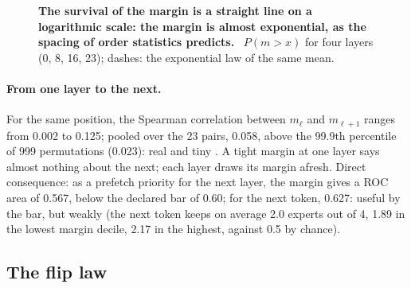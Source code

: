 \begin{figure}[tbp]
\centering
\GrapheTropicaleSurvie
\caption[The law of the margin]{\textbf{The survival of the margin is a straight line on a logarithmic scale: the margin is almost exponential, as the spacing of order statistics predicts.} \mes~$P(m > x)$ for four layers (0, 8, 16, 23); dashes: the exponential law of the same mean. }
\label{fig:t3-trop-survie}
\end{figure}

\paragraph{From one layer to the next.} For the same position, the Spearman correlation between $m_\ell$ and $m_{\ell+1}$ ranges from 0.002 to 0.125; pooled over the 23 pairs, 0.058, above the 99.9th percentile of 999 permutations (0.023): real and tiny \mes. A tight margin at one layer says almost nothing about the next; each layer draws its margin afresh. Direct consequence: as a prefetch priority for the next layer, the margin gives a ROC area of 0.567, below the declared bar of 0.60; for the next token, 0.627: useful by the bar, but weakly (the next token keeps on average 2.0 experts out of 4, 1.89 in the lowest margin decile, 2.17 in the highest, against 0.5 by chance).

\subsection{The flip law}\label{t3tro:sec:loi-bascule}

